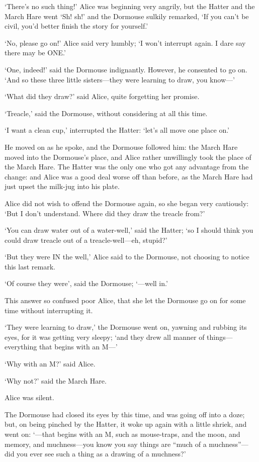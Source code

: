 \documentclass[12pt]{book}
\begin{document}
\begin{Parallel}[p]{}{}
{‘There’s no such thing!’ Alice was beginning very angrily, but the Hatter and the March Hare went ‘Sh! sh!’ and the Dormouse sulkily remarked, ‘If you can’t be civil, you’d better finish the story for yourself.’

‘No, please go on!’ Alice said very humbly; ‘I won’t interrupt again. I dare say there may be ONE.’

‘One, indeed!’ said the Dormouse indignantly. However, he consented to go on. ‘And so these three little sisters—they were learning to draw, you know—’

‘What did they draw?’ said Alice, quite forgetting her promise.

‘Treacle,’ said the Dormouse, without considering at all this time.

‘I want a clean cup,’ interrupted the Hatter: ‘let’s all move one place on.’

He moved on as he spoke, and the Dormouse followed him: the March Hare moved into the Dormouse’s place, and Alice rather unwillingly took the place of the March Hare. The Hatter was the only one who got any advantage from the change: and Alice was a good deal worse off than before, as the March Hare had just upset the milk-jug into his plate.

Alice did not wish to offend the Dormouse again, so she began very cautiously: ‘But I don’t understand. Where did they draw the treacle from?’

‘You can draw water out of a water-well,’ said the Hatter; ‘so I should think you could draw treacle out of a treacle-well—eh, stupid?’

‘But they were IN the well,’ Alice said to the Dormouse, not choosing to notice this last remark.

‘Of course they were’, said the Dormouse; ‘—well in.’

This answer so confused poor Alice, that she let the Dormouse go on for some time without interrupting it.

‘They were learning to draw,’ the Dormouse went on, yawning and rubbing its eyes, for it was getting very sleepy; ‘and they drew all manner of things—everything that begins with an M—’

‘Why with an M?’ said Alice.

‘Why not?’ said the March Hare.

Alice was silent.

The Dormouse had closed its eyes by this time, and was going off into a doze; but, on being pinched by the Hatter, it woke up again with a little shriek, and went on: ‘—that begins with an M, such as mouse-traps, and the moon, and memory, and muchness—you know you say things are “much of a muchness”—did you ever see such a thing as a drawing of a muchness?’

}
\end{Parallel}
\end{document}
